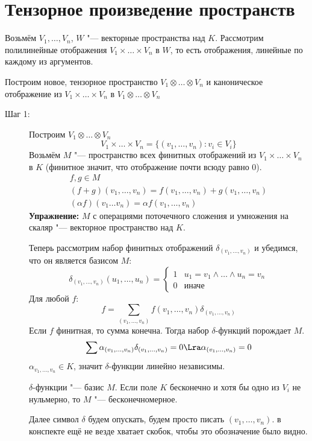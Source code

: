 ﻿\section{Тензорное произведение пространств}

Возьмём $V_1, \dots, V_n$, $W$ "--- векторные пространства над $K$.
Рассмотрим полилинейные отображения $V_1 \times \dots \times V_n$ в $W$,
то есть отображения, линейные по каждому из аргументов.

Построим новое, тензорное пространство $V_1 \otimes \dots \otimes V_n$
и каноническое отображение из $V_1 \times \dots \times V_n$ в $V_1 \otimes \dots \otimes V_n$

\begin{description}
\item[Шаг 1:]
	Построим $V_1 \otimes \dots \otimes V_n$
	\[ V_1 \times \dots \times V_n = \{(v_1, \dots, v_n)\colon v_i \in V_i\} \]
	Возьмём $M$ "--- пространство всех финитных отображений из $V_1 \times \dots \times V_n$ в $K$
	(финитное значит, что отображение почти всюду равно 0). 
	\begin{gather*}
		f, g \in M \\
		(f + g)(v_1, \dots, v_n) = f(v_1, \dots, v_n) + g(v_1, \dots, v_n) \\
		(\alpha f)(v_1 \dots v_n) = \alpha f(v_1, \dots, v_n)
	\end{gather*}
	\textbf{Упражнение:} $M$ с операциями поточечного сложения и умножения на скаляр "--- векторное пространство над $K$.
	
	Теперь рассмотрим набор финитных отображений $\delta_{(v_1,\dots, v_n)}$ и убедимся, что он является базисом $M$:
	\[
		\delta_{(v_1,\dots, v_n)}(u_1, \dots, u_n) = \begin{cases}
			1 & u_1 = v_1 \land \dots \land u_n = v_n \\
			0 & \text{иначе}
		\end{cases}
	\]
	Для любой $f$:
	\[ f = \sum_{(v_1, \dots, v_n)} f(v_1, \dots, v_n)\delta_{(v_1, \dots, v_n)} \]
	Если $f$ финитная, то сумма конечна.
	Тогда набор $\delta$-функций порождает $M$.
	\[ \sum \alpha_{(v_1, \dots, v_n)} \delta_{(v_1, \dots, v_n)} = 0 \Lra \alpha_{(v_1, \dots, v_n)} = 0 \]
	$\alpha_{v_1, \dots, v_n} \in K$, значит $\delta$-функции линейно независимы.

	$\delta$-функции "--- базис $M$.
	Если поле $K$ бесконечно и хотя бы одно из $V_i$ не нульмерно, то $M$ "--- бесконечномерное.

	Далее символ $\delta$ будем опускать, будем просто писать $(v_1, \dots, v_n)$.
	\TODO в конспекте ещё не везде хватает скобок, чтобы это обозначение было видно.


\end{description}
